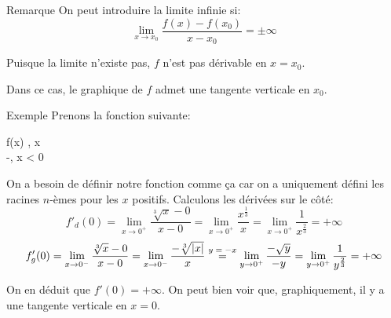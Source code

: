 \documentclass[a4paper]{article}
\begin{document}
\begin{parag}{Remarque}
    On peut introduire la limite infinie si:
    \[\lim_{x \to x_0} \frac{f\left(x\right) - f\left(x_0\right)}{x - x_0} = \pm \infty\]

    Puisque la limite n'existe pas, $f$ n'est pas dérivable en $x = x_0$.

    Dans ce cas, le graphique de $f$ admet une tangente verticale en $x_0$.
\end{parag}

\begin{parag}{Exemple}
    Prenons la fonction suivante:
    \begin{functionbypart}{f\left(x\right)}
    , \mathspace x  \\
    -, \mathspace x < 0
    \end{functionbypart}

    On a besoin de définir notre fonction comme ça car on a uniquement défini les racines $n$-èmes pour les $x$ positifs. Calculons les dérivées sur le côté:
    \[f'_d\left(0\right) = \lim_{x \to 0^+} \frac{\sqrt[3]{x} - 0}{x - 0} = \lim_{x \to 0^+} \frac{x^{\frac{1}{3}}}{x} = \lim_{x \to 0^+} \frac{1}{x^{\frac{2}{3}}} = +\infty\]
    \[f'_g\left(0\right) = \lim_{x \to 0^-} \frac{\sqrt[3]{x} - 0}{x - 0} = \lim_{x \to 0^-} \frac{-\sqrt[3]{\left|x\right|}}{x} \over{=}{$y = -x$} \lim_{y \to 0^+} \frac{-\sqrt{y}}{-y} = \lim_{y \to 0^+} \frac{1}{y^{\frac{2}{3}}} = +\infty\]

    On en déduit que $f'\left(0\right) = +\infty$. On peut bien voir que, graphiquement, il y a une tangente verticale en $x = 0$.

\end{parag}
\end{document}
